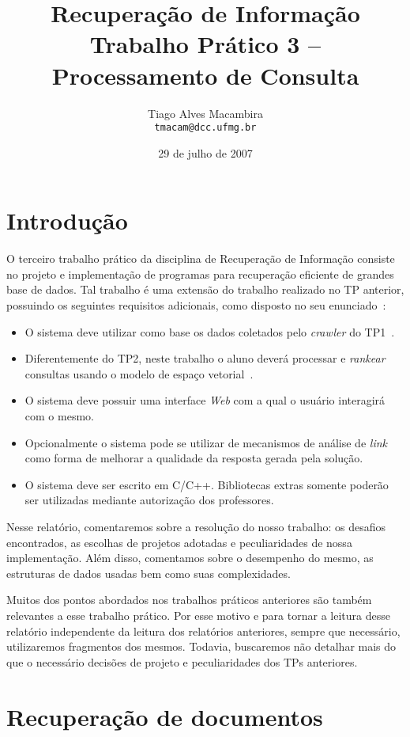 \documentclass[10pt,twocolumn]{article}
\title{Recuperação de Informação \\Trabalho Prático 3 -- Processamento
de Consulta}
\author{Tiago Alves Macambira \\ \texttt{tmacam@dcc.ufmg.br}}
\date{29 de julho de 2007}
\begin{document}
\maketitle

\section{Introdução}

O terceiro trabalho prático da disciplina de Recuperação de Informação
consiste no projeto e implementação de programas para
recuperação eficiente de grandes base de dados. Tal trabalho é uma
extensão do trabalho realizado no TP anterior, possuindo os seguintes
requisitos adicionais, como disposto no seu enunciado~\cite{tp3}:
\begin{itemize}
\item O sistema deve utilizar como base os dados coletados pelo
\emph{crawler} do TP1~\cite{tp1}.
\item Diferentemente do TP2, neste trabalho o aluno deverá processar e
\emph{rankear} consultas usando o modelo de espaço
vetorial~\cite{tp2}.
\item O sistema deve possuir uma interface \emph{Web} com a qual
o usuário interagirá com o mesmo.
\item Opcionalmente o sistema pode se utilizar de mecanismos de análise
de \emph{link} como forma de melhorar a qualidade da resposta gerada
pela solução.
\item O sistema deve ser escrito em C/C++. Bibliotecas extras somente
poderão ser utilizadas mediante autorização dos professores.
\end{itemize}

Nesse relatório, comentaremos sobre a resolução do nosso trabalho:
os desafios encontrados, as escolhas de projetos
adotadas e peculiaridades de nossa implementação. Além disso, comentamos
sobre o desempenho do mesmo, as estruturas de dados usadas bem como suas
complexidades.

Muitos dos pontos abordados nos trabalhos práticos anteriores são também
relevantes a esse trabalho prático. Por esse motivo e para tornar a
leitura desse relatório independente da leitura dos relatórios
anteriores, sempre que necessário, utilizaremos fragmentos dos mesmos.
Todavia, buscaremos não detalhar mais do que o necessário decisões
de projeto e peculiaridades dos TPs anteriores.

\section{Recuperação de documentos}\label{sec:retrieval}
\end{document}
